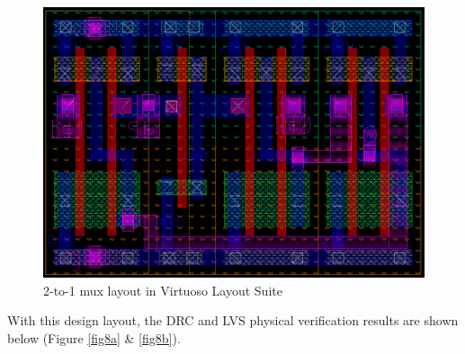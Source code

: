 \documentclass[letterpaper, 11pt]{article}
\begin{document}
\begin{figure}[htb!]
	\centering
	\includegraphics[width=1\linewidth]{mux_layout_final.png}
	\caption{2-to-1 mux layout in Virtuoso Layout Suite}
	\label{fig7}
\end{figure}
\newpage
With this design layout, the DRC and LVS physical verification results are shown below (Figure \ref{fig8a} \& \ref{fig8b}).
\end{document}
